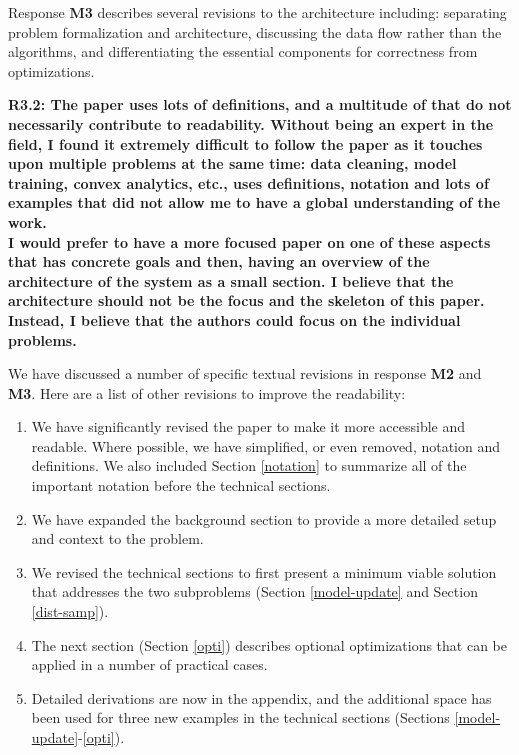 Response \textbf{M3} describes several revisions to the architecture including: separating problem formalization and architecture, discussing the data flow rather than the algorithms, and differentiating the essential components for correctness from optimizations.

\vspace{0.5em}

\noindent\textbf{R3.2: The paper uses lots of definitions, and a multitude of that do not necessarily contribute to readability.
Without being an expert in the field, I found it extremely difficult to follow the paper as it touches upon multiple problems at the same time: data cleaning, model training, convex analytics, etc., uses definitions, notation and lots of examples that did not allow me to have a global understanding of the work.\\
I would prefer to have a more focused paper on one of these aspects that has concrete goals and then, having an overview of the architecture of the system as a small section. I believe that the architecture should not be the focus and the skeleton of this paper. Instead, I believe that the authors could focus on the individual problems.}

We have discussed a number of specific textual revisions in response \textbf{M2} and \textbf{M3}. Here are a list of other revisions to improve the readability:

\begin{enumerate}
\item We have significantly revised the paper to make it more accessible and readable. Where possible, we have simplified, or even removed, notation and definitions. We also included Section \ref{notation} to summarize all of the important notation before the technical sections.
\item We have expanded the background section to provide a more detailed setup and context to the problem.
\item We revised the technical sections to first present a minimum viable solution that addresses the two subproblems (Section \ref{model-update} and Section  \ref{dist-samp}).
\item The next section (Section \ref{opti}) describes optional optimizations that can be applied in a number of practical cases.
\item Detailed derivations are now in the appendix, and the additional space has been used for three new examples in the technical sections (Sections \ref{model-update}-\ref{opti}).
\end{enumerate}
